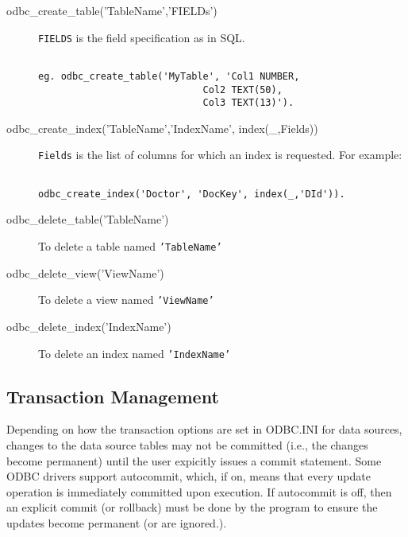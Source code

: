 \begin{description}

\item[odbc\_create\_table('TableName','FIELDs')]
        {\tt FIELDS} is the field specification as in SQL.
\begin{verbatim}

eg. odbc_create_table('MyTable', 'Col1 NUMBER,
                             Col2 TEXT(50),
                             Col3 TEXT(13)').
\end{verbatim}


\item[odbc\_create\_index('TableName','IndexName', index(\_,Fields))]
        {\tt Fields} is the list of columns for which an index
        is requested.  For example:
\begin{verbatim}

odbc_create_index('Doctor', 'DocKey', index(_,'DId')).
\end{verbatim}

\item[odbc\_delete\_table('TableName')] To delete a table named {\tt 'TableName'}

\item[odbc\_delete\_view('ViewName')] To delete a view named {\tt 'ViewName'}

\item[odbc\_delete\_index('IndexName')] To delete an index named {\tt 'IndexName'}
\end{description}

\subsection{Transaction Management}\label{TransactionManagement}

Depending on how the transaction options are set in ODBC.INI for data
sources, changes to the data source tables may not be
committed (i.e., the changes become permanent) until the user expicitly
issues a commit statement.  Some ODBC drivers support autocommit,
which, if on, means that every update operation is immediately
committed upon execution.  If autocommit is off, then an explicit
commit (or rollback) must be done by the program to ensure the updates 
become permanent (or are ignored.).

